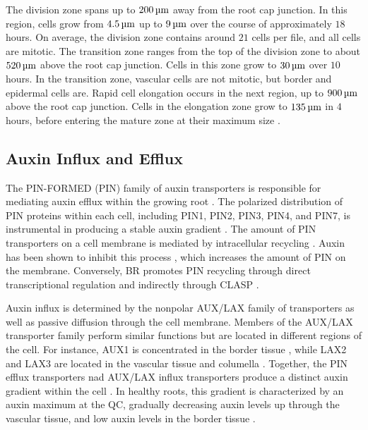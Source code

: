 \medskip

The division zone spans up to $\SI{200}{\micro\meter}$  away from the root cap junction. In this region, cells grow from $\SI{4.5}{\micro\meter}$ up to $\SI{9}{\micro\meter}$ over the course of approximately $18$ hours. On average, the division zone contains around $21$ cells per file, and all cells are mitotic. The transition zone ranges from the top of the division zone to about $\SI{520}{\micro\meter}$ above the root cap junction. Cells in this zone grow to $\SI{30}{\micro\meter}$ over $10$ hours. In the transition zone, vascular cells are not mitotic, but border and epidermal cells are. Rapid cell elongation occurs in the next region, up to $\SI{900}{\micro\meter}$ above the root cap junction. Cells in the elongation zone grow to $\SI{135}{\micro\meter}$ in $4$ hours, before entering the mature zone at their maximum size \cite{verbelen2006}.


\subsection{Auxin Influx and Efflux}

The PIN-FORMED (PIN) family of auxin transporters is responsible for mediating auxin efflux within the growing root \cite{krecek2009}. The polarized distribution of PIN proteins within each cell, including PIN1, PIN2, PIN3, PIN4, and PIN7, is instrumental in producing a stable auxin gradient \cite{yang2020}. The amount of PIN transporters on a cell membrane is mediated by intracellular recycling \cite{paciorek2005, ambrose2013}. Auxin has been shown to inhibit this process \cite{paciorek2005}, which increases the amount of PIN on the membrane. Conversely, BR promotes PIN recycling through direct transcriptional regulation \cite{hacham2012} and indirectly through CLASP \cite{ambrose2013}.

\medskip

Auxin influx is determined by the nonpolar AUX/LAX family of transporters \cite{swarup2012} as well as passive diffusion through the cell membrane. Members of the AUX/LAX transporter family perform similar functions but are located in different regions of the cell. For instance, AUX1 is concentrated in the border tissue \cite{swarup2001}, while LAX2 and LAX3 are located in the vascular tissue and columella \cite{swarup2012}. Together, the PIN efflux transporters nad AUX/LAX influx transporters produce a distinct auxin gradient within the cell \cite{band2014}. In healthy roots, this gradient is characterized by an auxin maximum at the QC, gradually decreasing auxin levels up through the vascular tissue, and low auxin levels in the border tissue \cite{grieneisen2007}.

